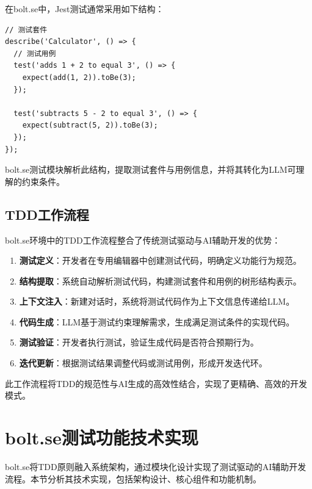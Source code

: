 在bolt.se中，Jest测试通常采用如下结构：

\begin{verbatim}
// 测试套件
describe('Calculator', () => {
  // 测试用例
  test('adds 1 + 2 to equal 3', () => {
    expect(add(1, 2)).toBe(3);
  });
  
  test('subtracts 5 - 2 to equal 3', () => {
    expect(subtract(5, 2)).toBe(3);
  });
});
\end{verbatim}

bolt.se测试模块解析此结构，提取测试套件与用例信息，并将其转化为LLM可理解的约束条件。

\subsection{TDD工作流程}

bolt.se环境中的TDD工作流程整合了传统测试驱动与AI辅助开发的优势：

\begin{enumerate}
  \item \textbf{测试定义}：开发者在专用编辑器中创建测试代码，明确定义功能行为规范。
  
  \item \textbf{结构提取}：系统自动解析测试代码，构建测试套件和用例的树形结构表示。
  
  \item \textbf{上下文注入}：新建对话时，系统将测试代码作为上下文信息传递给LLM。
  
  \item \textbf{代码生成}：LLM基于测试约束理解需求，生成满足测试条件的实现代码。
  
  \item \textbf{测试验证}：开发者执行测试，验证生成代码是否符合预期行为。
  
  \item \textbf{迭代更新}：根据测试结果调整代码或测试用例，形成开发迭代环。
\end{enumerate}

此工作流程将TDD的规范性与AI生成的高效性结合，实现了更精确、高效的开发模式。

\section{bolt.se测试功能技术实现}

bolt.se将TDD原则融入系统架构，通过模块化设计实现了测试驱动的AI辅助开发流程。本节分析其技术实现，包括架构设计、核心组件和功能机制。

